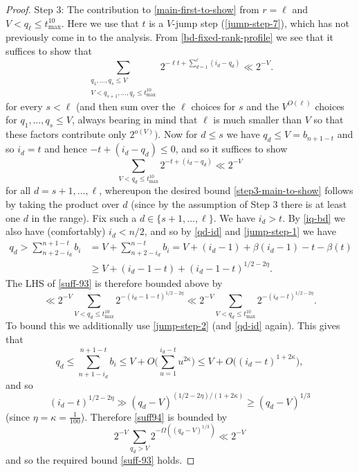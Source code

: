 \documentclass[11pt,reqno]{amsart}
\numberwithin{equation}{section}
\theoremstyle{definition}
\theoremstyle{remark}
\renewcommand{\le}{\leqslant}
\renewcommand{\ge}{\geqslant}
\begin{document}
\begin{proof}
Step 3: The contribution to \cref{main-first-to-show} from $r = \ell$ and $V < q_{\ell} \le t_{\max}^{10}$. Here we use that $t$ is a $V$-jump step (\cref{jump-step-7}), which has not previously come in to the analysis. From \cref{bd-fixed-rank-profile} we see that it suffices to show that \begin{equation}\label{step3-main-to-show} \sum_{ \substack{q_1,\dots, q_s \le V \\  V < q_{s + 1}, \dots, q_{\ell} \le t_{\max}^{10}}} 2^{-\ell t + \sum_{d = 1}^{\ell}  (i_d - q_d)} \ll 2^{-V}.\end{equation} for every $s < \ell$ (and then sum over the $\ell$ choices for $s$ and the $V^{O(\ell)}$ choices for $q_1,\dots, q_s \le V$, always bearing in mind that $\ell$ is much smaller than $V$ so that these factors contribute only $2^{o(V)})$. Now for $d \le s$ we have $q_d \le V = b_{n + 1 - t}$ and so $i_d = t$ and hence $-t + (i_d - q_d) \le 0$, and so it suffices to show
\begin{equation}\label{suff-93} \sum_{V < q_d \le t_{\max}^{10}} 2^{-t + (i_d - q_d)} \ll 2^{-V}\end{equation} for all $d = s+1,\dots, \ell$, whereupon the desired bound \cref{step3-main-to-show} follows by taking the product over $d$ (since by the assumption of Step 3 there is at least one $d$ in the range). Fix such a $d \in \{s+1,\dots, \ell\}$. We have $i_d > t$. By \cref{iq-bd} we also have (comfortably) $i_d < n/2$, and so by \cref{qd-id} and \cref{jump-step-1} we have
\begin{align*}
q_d > \sum_{n +2 - i_d}^{n + 1 - t} b_i  & = V + \sum_{n +2 -  i_d}^{n - t} b_i = V + (i_d-1) + \beta(i_d -1) - t - \beta(t) \\ & \ge V + (i_d -1 - t) + (i_d -1 - t)^{1/2 - 2\eta}.
\end{align*}
The LHS of \cref{suff-93} is therefore bounded above by
\begin{equation}\label{suff94} \ll 2^{-V}\sum_{V < q_{d} \le t_{\max}^{10}} 2^{-(i_{d} - 1- t)^{1/2 - 2\eta}} \ll 2^{-V}\sum_{V < q_{d} \le t_{\max}^{10}} 2^{-(i_{d} - t)^{1/2 - 2\eta}}.\end{equation}
To bound this we additionally use \cref{jump-step-2} (and \cref{qd-id} again). This gives that 
\[ q_{d} \le \sum_{n+1  - i_d}^{n + 1 - t} b_i \le V + O \big(\sum_{u = 1}^{i_d - t} u^{2 \kappa}\big) \le V + O\big((i_d - t)^{1 + 2\kappa}\big),\]
and so
\[ (i_d - t)^{1/2 - 2\eta} \gg  (q_d - V)^{(1/2 - 2\eta)/(1 + 2\kappa)} \ge (q_d - V)^{1/3} \] (since $\eta = \kappa = \frac{1}{100}$). Therefore \cref{suff94} is bounded by 
\[ 2^{-V}\sum_{q_d > V} 2^{- \Omega((q_{d} - V)^{1/3})} \ll 2^{-V}\]
and so the required bound \cref{suff-93} holds.\vspace*{8pt}


\end{proof}
\end{document}
